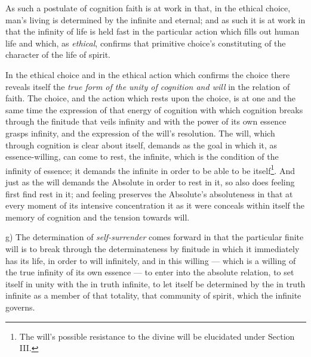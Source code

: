 \documentclass[12pt,a4paper]{book}
\begin{document}
As such a postulate of cognition faith is at work in that, in the ethical
choice, man's living is determined by the infinite and eternal; and as such it
is at work in that the infinity of life is held fast in the particular action
which fills out human life and which, as \emph{ethical}, confirms that
primitive choice's constituting of the character of the life of spirit.

In the ethical choice and in the ethical action which confirms the choice
there reveals itself the \emph{true form of the unity of cognition and will}
in the relation of faith. The choice, and the action which rests upon the
choice, is at one and the same time
\setcounter{footnote}{0}%
the expression of that energy of cognition with which cognition breaks through
the finitude that veils infinity and with the power of its own essence grasps
infinity, and the expression of the will's resolution. The will, which through
cognition is clear about itself, demands as the goal in which it, as
essence-willing, can come to rest, the infinite, which is the condition of the
infinity of essence; it demands the infinite in order to be able to be
itself\footnote{The will's possible resistance to the divine will be
elucidated under Section III.}. And just as the will demands the Absolute in
order to rest in it, so also does feeling first find rest in it; and feeling
preserves the Absolute's absoluteness in that at every moment of its intensive
concentration it as it were conceals within itself the memory of cognition and
the tension towards will.

g) The determination of \emph{self-surrender} comes forward in that the
particular finite will is to break through the determinateness by finitude in
which it immediately has its life, in order to will infinitely, and in this
willing --- which is a willing of the true infinity of its own essence --- to
enter into the absolute relation, to set itself in unity with the in truth
infinite, to let itself be determined by the in truth infinite as a member of
that totality, that community of spirit, which the infinite governs.
\end{document}
